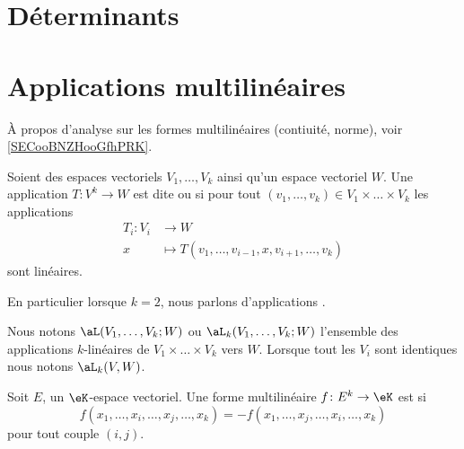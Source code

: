 
\section{Déterminants}
\label{SecGYzHWs}


\section{Applications multilinéaires}

À propos d'analyse sur les formes multilinéaires (contiuité, norme), voir \ref{SECooBNZHooGfhPRK}.

\begin{definition}       \label{DefFRHooKnPCT}
	Soient des espaces vectoriels \( V_1,\ldots,V_k\) ainsi qu'un espace vectoriel \( W\). Une application \(T \colon V^k\to W  \) est dite  ou  si pour tout \( (v_1, \ldots,v_k)\in V_1\times \ldots\times V_k\) les applications
	\begin{equation}
		\begin{aligned}
			T_i\colon V_i & \to W                                                 \\
			x             & \mapsto T(v_1,\ldots, v_{i-1}, x,v_{i+1},\ldots, v_k)
		\end{aligned}
	\end{equation}
	sont linéaires.

	En particulier lorsque \( k=2\), nous parlons d'applications .

	Nous notons \( \aL(V_1,\ldots,V_k;W)\) ou \( \aL_k(V_1,\ldots,V_k;W)\) l'ensemble des applications \( k\)-linéaires de \( V_1\times \ldots \times V_k\) vers \( W\). Lorsque tout les \( V_i\) sont identiques nous notons \( \aL_k(V,W)\).
\end{definition}


\begin{definition}	\label{DEFooZFCKooGIoYrE}
	Soit \( E\), un \( \eK\)-espace vectoriel. Une forme multilinéaire \(f \colon E^k\to \eK  \) est  si
	\begin{equation}
		f(x_1,\ldots,x_i,\ldots,x_j,\ldots,x_k)=-f(x_1,\ldots,x_j,\ldots,x_i,\ldots,x_k)
	\end{equation}
	pour tout couple \( (i,j)\).
\end{definition}

